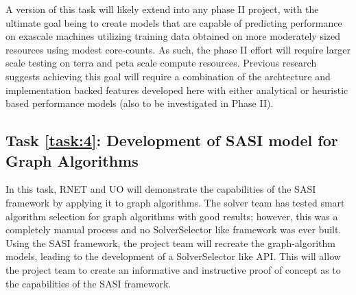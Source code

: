 A version of this task will likely extend into any phase II project, with the ultimate goal being to create models that are capable of predicting performance on exascale machines utilizing training data obtained on more moderately sized resources using modest core-counts. As such, the phase II effort will require larger scale testing on terra and peta scale compute resources. Previous research suggests achieving this goal will require a combination of the archtecture and implementation backed features developed here with either analytical or heuristic based performance models (also to be investigated in Phase II).  

\label{task:4}
\subsection{Task \ref{task:4}: Development of SASI model for Graph Algorithms }

In this task, RNET and UO will demonstrate the capabilities of the SASI framework by applying 
it to graph algorithms. The solver team has tested smart algorithm selection for graph algorithms 
with good results; however, this was a completely manual process and no SolverSelector like framework was ever built. Using 
the SASI framework, the project team will recreate the graph-algorithm models, leading to the development of a SolverSelector
like API. This will allow the project team to create an informative and instructive proof of concept as to the capabilities 
of the SASI framework. 
